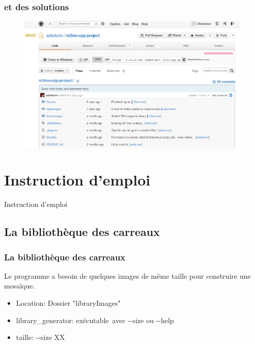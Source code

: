 \documentclass[handout]{beamer}
\newcommand{\tcb}{\color{blue}}
\begin{document}
\begin{frame}
\frametitle{\bf et des solutions}
\begin{figure}[H]
\includegraphics[scale=0.36]{GitHubCommits.png}
\end{figure}
\end{frame}

\section{Instruction d'emploi}
\begin{frame}
\begin{center}
{\Huge Instruction d'emploi}
\end{center}
\end{frame}


\subsection{La biblioth\`eque des carreaux}

\begin{frame}
\frametitle{\bf La biblioth\`eque des carreaux}
Le programme a besoin de quelques images de m\^eme taille pour construire une mosa\"{i}que.
\begin{itemize}
\item {\tcb Location}: Dossier "libraryImages"

\item {\tcb library\_generator}: ex\'ecutable\ avec {-}{-}size ou {-}{-}help

\item {\tcb taille}: {-}{-}size XX
\end{itemize}

\end{frame}
\end{document}
